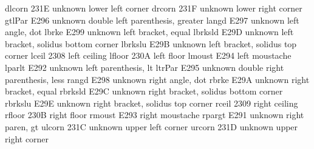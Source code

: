 %
%

 dlcorn        231E {unknown} lower left corner
 drcorn        231F {unknown} lower right corner
 gtlPar        E296 {unknown} double left parenthesis, greater
 langd         E297 {unknown} left angle, dot
 lbrke         E299 {unknown} left bracket, equal
 lbrksld       E29D {unknown} left bracket, solidus bottom corner
 lbrkslu       E29B {unknown} left bracket, solidus top corner
 lceil         2308 {\lceil} left ceiling
 lfloor        230A {\lfloor} left floor
 lmoust        E294 {\lmoustache} left moustache
 lparlt        E292 {unknown} left parenthesis, lt
 ltrPar        E295 {unknown} double right parenthesis, less
 rangd         E298 {unknown} right angle, dot
 rbrke         E29A {unknown} right bracket, equal
 rbrksld       E29C {unknown} right bracket, solidus bottom corner
 rbrkslu       E29E {unknown} right bracket, solidus top corner
 rceil         2309 {\rceil} right ceiling
 rfloor        230B {\rfloor} right floor
 rmoust        E293 {\rmoustache} right moustache
 rpargt        E291 {unknown} right paren, gt
 ulcorn        231C {unknown} upper left corner
 urcorn        231D {unknown} upper right corner

